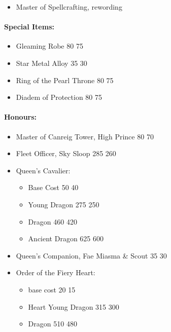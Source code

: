 
\subtitle{beta 2.2}

\begin{itemize}
\item Master of Spellcrafting, rewording
\end{itemize}


\begin{multicols}{2}
\paragraph{Special Items:}
\begin{itemize}
	\item Gleaming Robe 80 \costdown{} 75
	\item Star Metal Alloy 35 \costdown{} 30
	\item Ring of the Pearl Throne 80 \costdown{} 75
	\item Diadem of Protection 80 \costdown{} 75
\end{itemize}
\paragraph{Honours:}
\begin{itemize}
	\item Master of Canreig Tower, High Prince 80 \costdown{} 70
	\item Fleet Officer, Sky Sloop 285 \costdown{} 260
	\item Queen's Cavalier:
	\begin{itemize}
		\item Base Cost	50 \costdown{} 40
		\item Young Dragon 275 \costdown{} 250
		\item Dragon 460 \costdown{} 420
		\item Ancient Dragon 625 \costdown{} 600
	\end{itemize}
	\item Queen's Companion, Fae Miasma \& Scout 35 \costdown{} 30
	\item Order of the Fiery Heart:
	\begin{itemize}
		\item base cost 20 \costdown{} 15
		\item Heart Young Dragon 315 \costdown{} 300
		\item Dragon 510 \costdown{} 480
	\end{itemize}
\end{itemize}

\end{multicols}
